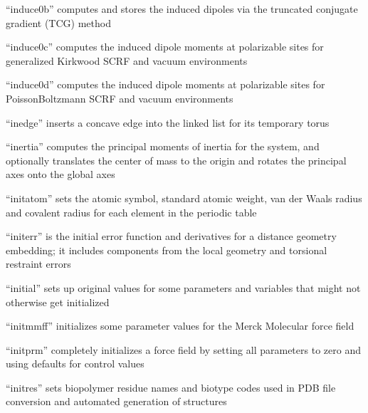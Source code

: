 \documentclass[letterpaper,11pt,english]{sphinxmanual}
\begin{document}
“induce0b” computes and stores the induced dipoles via
the truncated conjugate gradient (TCG) method


“induce0c” computes the induced dipole moments at polarizable
sites for generalized Kirkwood SCRF and vacuum environments


“induce0d” computes the induced dipole moments at polarizable
sites for Poisson\sphinxhyphen{}Boltzmann SCRF and vacuum environments


“inedge” inserts a concave edge into the
linked list for its temporary torus


“inertia” computes the principal moments of inertia for the
system, and optionally translates the center of mass to the
origin and rotates the principal axes onto the global axes


“initatom” sets the atomic symbol, standard atomic weight,
van der Waals radius and covalent radius for each element in
the periodic table


“initerr” is the initial error function and derivatives for
a distance geometry embedding; it includes components from
the local geometry and torsional restraint errors


“initial” sets up original values for some parameters and
variables that might not otherwise get initialized


“initmmff” initializes some parameter values for the Merck
Molecular force field


“initprm” completely initializes a force field by setting all
parameters to zero and using defaults for control values


“initres” sets biopolymer residue names and biotype codes used
in PDB file conversion and automated generation of structures
\end{document}
